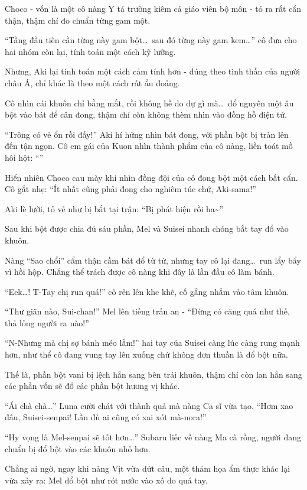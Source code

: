 \documentclass[../main.tex]{subfiles}
\begin{document}
Choco - vốn là một cô nàng Y tá trường kiêm cả giáo viên bộ môn - tỏ ra rất cẩn thận, thậm chí đo chuẩn từng gam một.

``Tầng đầu tiên cần từng này gam bột\dots\ sau đó từng này gam kem\dots'' cô đưa cho hai nhóm còn lại, tính toán một cách kỹ lưỡng.

Nhưng, Aki lại tính toán một cách cảm tính hơn - đúng theo tinh thần của người châu Á, chỉ khác là theo một cách rất ẩu đoảng.

Cô nhìn cái khuôn chỉ bằng mắt, rồi không hề do dự gì mà\dots\ đổ nguyên một âu bột vào bát để cân đong, thậm chí còn không thèm nhìn vào đồng hồ điện tử.

``Trông có vẻ ổn rồi đấy!'' Aki hí hửng nhìn bát đong, với phần bột bị tràn lên đến tận ngọn. Cô em gái của Kuon nhìn thành phẩm của cô nàng, liền toát mồ hôi hột: ``''

Hiển nhiên Choco cau mày khi nhìn đồng đội của cô đong bột một cách bất cẩn. Cô gắt nhẹ: ``Ít nhất cũng phải đong cho nghiêm túc chứ, Aki-sama!''

Aki lè lưỡi, tỏ vẻ như bị bắt tại trận: ``Bị phát hiện rồi ha\~{}''

\ct

Sau khi bột được chia đủ sáu phần, Mel và Suisei nhanh chóng bắt tay đổ vào khuôn.

Nàng ``Sao chổi'' cẩm thận cầm bát đổ từ từ, nhưng tay cô lại đang\dots\ run lẩy bẩy vì hồi hộp. Chẳng thể trách được cô nàng khi đây là lần đầu cô làm bánh.

``Eek\dots! T-Tay chị run quá!'' cô rên lên khe khẽ, cố gắng nhắm vào tâm khuôn.

``Thư giãn nào, Sui-chan!'' Mel lên tiếng trấn an - ``Đừng có căng quá như thế, thả lỏng người ra nào!''

``N-Nhưng mà chị sợ bánh méo lắm!'' hai tay của Suisei càng lúc càng rung mạnh hơn, như thể cô đang vung tay lên xuống chứ không đơn thuần là đổ bột nữa.

Thế là, phần bột vani bị lệch hẳn sang bên trái khuôn, thậm chí còn lan hẳn sang các phần vốn sẽ đổ các phần bột hương vị khác.

``Ái chà chà\dots'' Luna cười chát với thành quả mà nàng Ca sĩ vừa tạo. ``Hơm xao đâu, Suisei-senpai! Lần đù ai cũng có xai xót mà-nora!''

``Hy vọng là Mel-senpai sẽ tốt hơn\dots'' Subaru liếc về nàng Ma cà rồng, người đang chuẩn bị đổ bột vào các khuôn nhỏ hơn.

Chẳng ai ngờ, ngay khi nàng Vịt vừa dứt câu, một thảm họa ẩm thực khác lại vừa xảy ra: Mel đổ bột như rót nước vào xô do quá tay.
\end{document}
